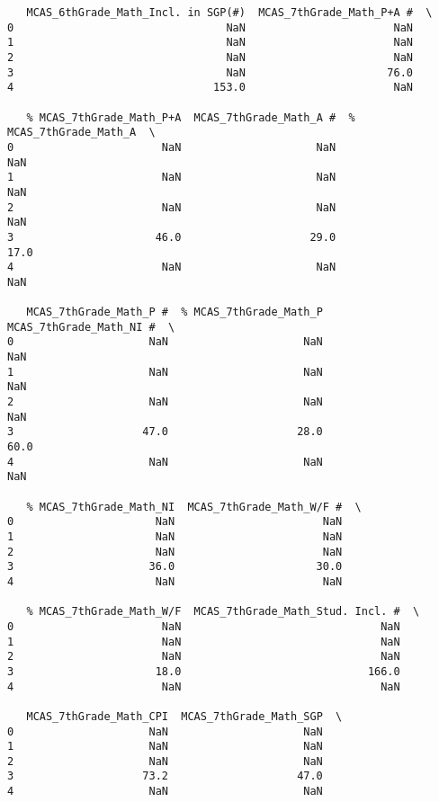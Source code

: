 \documentclass[11pt]{article}
\begin{document}
\begin{verbatim}
   MCAS_6thGrade_Math_Incl. in SGP(#)  MCAS_7thGrade_Math_P+A #  \
0                                 NaN                       NaN   
1                                 NaN                       NaN   
2                                 NaN                       NaN   
3                                 NaN                      76.0   
4                               153.0                       NaN   

   % MCAS_7thGrade_Math_P+A  MCAS_7thGrade_Math_A #  % MCAS_7thGrade_Math_A  \
0                       NaN                     NaN                     NaN   
1                       NaN                     NaN                     NaN   
2                       NaN                     NaN                     NaN   
3                      46.0                    29.0                    17.0   
4                       NaN                     NaN                     NaN   

   MCAS_7thGrade_Math_P #  % MCAS_7thGrade_Math_P  MCAS_7thGrade_Math_NI #  \
0                     NaN                     NaN                      NaN   
1                     NaN                     NaN                      NaN   
2                     NaN                     NaN                      NaN   
3                    47.0                    28.0                     60.0   
4                     NaN                     NaN                      NaN   

   % MCAS_7thGrade_Math_NI  MCAS_7thGrade_Math_W/F #  \
0                      NaN                       NaN   
1                      NaN                       NaN   
2                      NaN                       NaN   
3                     36.0                      30.0   
4                      NaN                       NaN   

   % MCAS_7thGrade_Math_W/F  MCAS_7thGrade_Math_Stud. Incl. #  \
0                       NaN                               NaN   
1                       NaN                               NaN   
2                       NaN                               NaN   
3                      18.0                             166.0   
4                       NaN                               NaN   

   MCAS_7thGrade_Math_CPI  MCAS_7thGrade_Math_SGP  \
0                     NaN                     NaN   
1                     NaN                     NaN   
2                     NaN                     NaN   
3                    73.2                    47.0   
4                     NaN                     NaN   


\end{verbatim}
\end{document}
